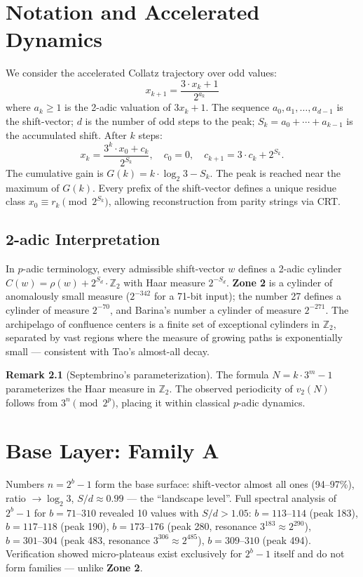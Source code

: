 \documentclass[12pt,a4paper]{article}
\theoremstyle{remark}
\begin{document}
\section{Notation and Accelerated Dynamics}
We consider the accelerated Collatz trajectory over odd values:
\begin{equation}
x_{k+1} = \frac{3 \cdot x_k + 1}{2^{a_k}}
\end{equation}
where $a_k \ge 1$ is the 2-adic valuation of $3x_k + 1$. The sequence $a_0, a_1, \dots, a_{d-1}$ is the shift-vector; $d$ is the number of odd steps to the peak; $S_k = a_0 + \cdots + a_{k-1}$ is the accumulated shift. After $k$ steps:
\begin{equation}
x_k = \frac{3^k \cdot x_0 + c_k}{2^{S_k}}, \quad c_0 = 0, \quad c_{k+1} = 3 \cdot c_k + 2^{S_k}.
\end{equation}
The cumulative gain is $G(k) = k \cdot \log_2 3 - S_k$. The peak is reached near the maximum of $G(k)$. Every prefix of the shift-vector defines a unique residue class $x_0 \equiv r_k \pmod{2^{S_k}}$, allowing reconstruction from parity strings via CRT.

\subsection{2-adic Interpretation}
In $p$-adic terminology, every admissible shift-vector $w$ defines a 2-adic cylinder $C(w) = \rho(w) + 2^{S_d} \cdot \mathbb{Z}_2$ with Haar measure $2^{-S_d}$. \textbf{Zone 2} is a cylinder of anomalously small measure ($2^{-342}$ for a 71-bit input); the number 27 defines a cylinder of measure $2^{-70}$, and Barina's number a cylinder of measure $2^{-271}$. The archipelago of confluence centers is a finite set of exceptional cylinders in $\mathbb{Z}_2$, separated by vast regions where the measure of growing paths is exponentially small --- consistent with Tao's almost-all decay.
\smallskip

\noindent\textbf{Remark 2.1} (Septembrino's parameterization).
The formula $N = k \cdot 3^m - 1$ parameterizes the Haar measure in $\mathbb{Z}_2$. The observed periodicity of $v_2(N)$ follows from $3^n \pmod{2^p}$, placing it within classical $p$-adic dynamics.

\section{Base Layer: Family A}
Numbers $n = 2^b - 1$ form the base surface: shift-vector almost all ones (94--97\%), ratio $\to \log_2 3$, $S/d \approx 0.99$ --- the ``landscape level''. Full spectral analysis of $2^b - 1$ for $b = 71\text{--}310$ revealed 10 values with $S/d > 1.05$: $b=113\text{--}114$ (peak 183), $b=117\text{--}118$ (peak 190), $b=173\text{--}176$ (peak 280, resonance $3^{183}\approx2^{290}$), $b=301\text{--}304$ (peak 483, resonance $3^{306}\approx2^{485}$), $b=309\text{--}310$ (peak 494). Verification showed micro-plateaus exist exclusively for $2^b-1$ itself and do not form families --- unlike \textbf{Zone 2}.
\end{document}
